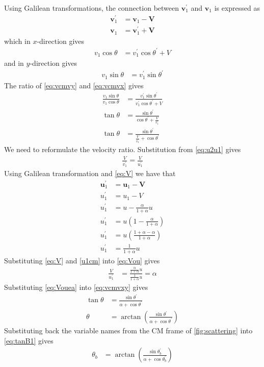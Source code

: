 \documentclass[twoside,english]{uiofysmaster/uiofysmaster}
\let\orgautoref\autoref
\renewcommand{\autoref}
        {%
		 \def\sectionautorefname{Section}%
		 \def\subsectionautorefname{Section}%
		 \def\subsubsectionautorefname{Section}%
		 \def\chapterautorefname{Chapter}%
          \orgautoref}
\begin{document}
\begin{appendices}
Using Galilean transformations, the connection between $\boldsymbol{v}_1^{'}$ and $\boldsymbol{v}_1$ is expressed as
\begin{align}\label{eq:vcmv}
	\boldsymbol{v}_1^{'} &= \boldsymbol{v}_1 - \boldsymbol{V} \nonumber\\
	\boldsymbol{v}_1 &= \boldsymbol{v}_1^{'} + \boldsymbol{V}
\end{align}
which in $x$-direction gives
\begin{align}\label{eq:vcmvx}
	v_1 \cos \theta &= v_1^{'} \cos \theta^{'} + V
\end{align}
and in $y$-direction gives
\begin{align}\label{eq:vcmvy}
	v_1 \sin \theta &= v_1^{'} \sin \theta^{'}
\end{align}
The ratio of \autoref{eq:vcmvy} and \autoref{eq:vcmvx} gives
\begin{align}\label{eq:vcmvxy}
	\frac{v_1 \sin \theta}{v_1 \cos \theta} &= \frac{v_1^{'} \sin \theta^{'}}{v_1^{'} \cos \theta^{'} + V} \nonumber\\
	\tan \theta &= \frac{\sin \theta^{'}}{\cos \theta^{'} + \frac{V}{v_1^{'}}} \nonumber\\
	\tan \theta &= \frac{\sin \theta^{'}}{\frac{V}{v_1^{'}} + \cos \theta^{'}}
\end{align}
We need to reformulate the velocity ratio. 
Substitution from \autoref{eq:u2u1} gives
\begin{align}\label{eq:Vou}
	\frac{V}{v_1^{'}} = \frac{V}{u_1^{'}}
\end{align}
Using Galilean transformation and \autoref{eq:V} we have that
\begin{align}\label{u1cm}
	\boldsymbol{u}_1^{'} &= \boldsymbol{u}_1 - \boldsymbol{V} \nonumber\\
	u_1^{'} &= u_1 - V \nonumber\\
	u_1^{'} &= u - \frac{\alpha}{1 + \alpha} u \nonumber\\
	u_1^{'} &= u \left( 1 - \frac{\alpha}{1 + \alpha} \right) \nonumber\\
	u_1^{'} &= u \left( \frac{1 + \alpha - \alpha}{1 + \alpha} \right) \nonumber\\
	u_1^{'} &= \frac{1}{1 + \alpha} u
\end{align}
Substituting \autoref{eq:V} and \autoref{u1cm} into \autoref{eq:Vou} gives
\begin{align}\label{eq:Vouea}
	\frac{V}{u_1^{'}} &= \frac{\frac{\alpha}{1 + \alpha} u}{\frac{1}{1 + \alpha} u} = \alpha
\end{align}
Substituting \autoref{eq:Vouea} into \autoref{eq:vcmvxy} gives
\begin{align}\label{eq:tanB1}
	\tan \theta &= \frac{\sin \theta^{'}}{\alpha + \cos \theta^{'}}  \nonumber\\
	\theta &= \arctan \left( \frac{\sin \theta^{'}}{\alpha + \cos \theta^{'}} \right)
\end{align}
Substituting back the variable names from the CM frame of \autoref{fig:scattering} into \autoref{eq:tanB1} gives
\begin{align}\label{eq:tanB1n}
	\theta_b &= \arctan \left( \frac{\sin \theta_b^{'}}{\alpha + \cos \theta_b^{'}} \right)
\end{align}


\end{appendices}
\end{document}
